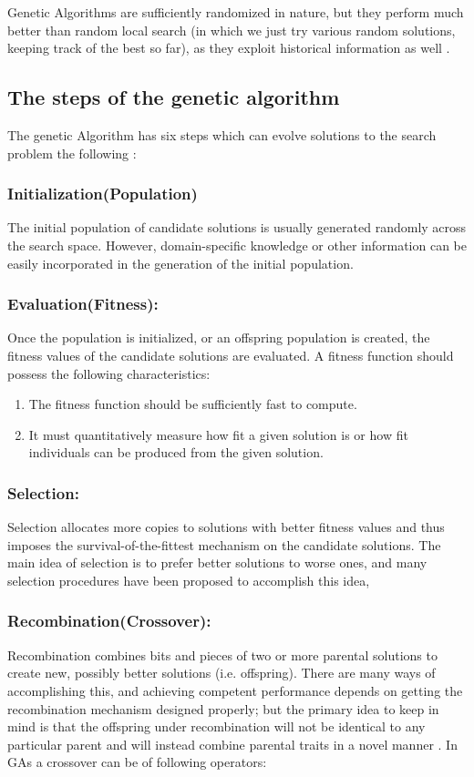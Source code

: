 Genetic Algorithms are sufficiently randomized in nature, but they perform much better than random local search (in which we just try various random solutions, keeping track of the best so far), as they exploit historical information as well \cite{GAs}.
\newpage
\subsection{The steps of the genetic algorithm}
The genetic Algorithm has six steps which can evolve solutions to the search problem the following \cite{sastry2005genetic}:
\subsubsection{Initialization(Population)}
The initial population of candidate solutions is usually generated
randomly across the search space. However, domain-specific knowledge or other
information can be easily incorporated in the generation of the initial population.

\subsubsection{Evaluation(Fitness):}
Once the population is initialized, or an offspring population is created, the fitness values of the candidate solutions are evaluated.
A fitness function should possess the following characteristics:

\begin{enumerate}
    \item{The fitness function should be sufficiently fast to compute.}
    \item{It must quantitatively measure how fit a given solution is or how fit individuals can be produced from the given solution.}
\end{enumerate}

\subsubsection{Selection:} Selection allocates more copies to solutions with better fitness values and thus imposes the survival-of-the-fittest mechanism on the candidate solutions. The main idea of selection is to prefer better solutions to worse ones, and many selection procedures have been proposed to accomplish this idea, 
\subsubsection{Recombination(Crossover):}
Recombination combines bits and pieces of two or more parental solutions to create new, possibly better solutions (i.e. offspring). There are many ways of accomplishing this, and achieving competent performance depends on getting the recombination mechanism designed properly; but the primary idea to keep in mind is
that the offspring under recombination will not be identical to any particular parent and will instead combine parental traits in a novel manner \cite{goldberg1999using}.
\newpage
In GAs a crossover can be of following operators:
